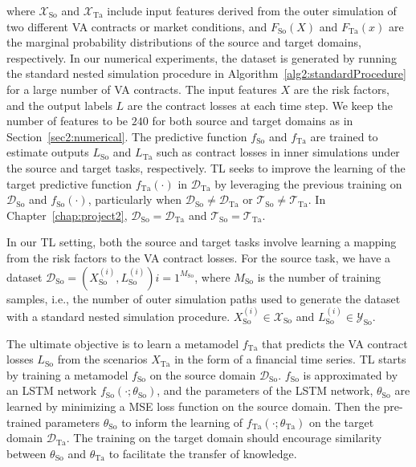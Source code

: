 where $\mathcal{X}_{\text{So}}$ and $\mathcal{X}_{\text{Ta}}$ include input features derived from the outer simulation of two different VA contracts or market conditions, and $F_{\text{So}}(X)$ and $F_{\text{Ta}}(x)$ are the marginal probability distributions of the source and target domains, respectively.
In our numerical experiments, the dataset is generated by running the standard nested simulation procedure in Algorithm~\ref{alg2:standardProcedure} for a large number of VA contracts.
The input features $X$ are the risk factors, and the output labels $L$ are the contract losses at each time step.
We keep the number of features to be $240$ for both source and target domains as in Section~\ref{sec2:numerical}.
The predictive function $f_{\text{So}}$ and $f_{\text{Ta}}$ are trained to estimate outputs $L_{\text{So}}$ and $L_{\text{Ta}}$ such as contract losses in inner simulations under the source and target tasks, respectively.
TL seeks to improve the learning of the target predictive function $f_{\text{Ta}}(\cdot)$ in $\mathcal{D}_{\text{Ta}}$ by leveraging the previous training on $\mathcal{D}_{\text{So}}$ and $f_{\text{So}}(\cdot)$, particularly when $\mathcal{D}_{\text{So}} \neq \mathcal{D}_{\text{Ta}}$ or $\mathcal{T}_{\text{So}} \neq \mathcal{T}_{\text{Ta}}$.
In Chapter~\ref{chap:project2}, $\mathcal{D}_{\text{So}} = \mathcal{D}_{\text{Ta}}$ and $\mathcal{T}_{\text{So}} = \mathcal{T}_{\text{Ta}}$.

In our TL setting, both the source and target tasks involve learning a mapping from the risk factors to the VA contract losses.
For the source task, we have a dataset $\mathcal{D}_{\text{So}} = { (X_{\text{So}}^{(i)}, L_{\text{So}}^{(i)}) }{i=1}^{M_{\text{So}}}$, where $M_{\text{So}}$ is the number of training samples, i.e., the number of outer simulation paths used to generate the dataset with a standard nested simulation procedure.
$X_{\text{So}}^{(i)} \in \mathcal{X}_{\text{So}}$ and $L_{\text{So}}^{(i)} \in \mathcal{Y}_{\text{So}}$.
 
The ultimate objective is to learn a metamodel $f_{\text{Ta}}$ that predicts the VA contract losses $L_{\text{So}}$ from the scenarios $X_{\text{Ta}}$ in the form of a financial time series.
TL starts by training a metamodel $f_{\text{So}}$ on the source domain $\mathcal{D}_{\text{So}}$.
$f_{\text{So}}$ is approximated by an LSTM network $f_{\text{So}}(\cdot ; \theta_{\text{So}})$, and the parameters of the LSTM network, $\theta_{\text{So}}$ are learned by minimizing a MSE loss function on the source domain.
Then the pre-trained parameters $\theta_{\text{So}}$ to inform the learning of $f_{\text{Ta}}(\cdot ; \theta_{\text{Ta}})$ on the target domain $\mathcal{D}_{\text{Ta}}$.
The training on the target domain should encourage similarity between $\theta_{\text{So}}$ and $\theta_{\text{Ta}}$ to facilitate the transfer of knowledge.

